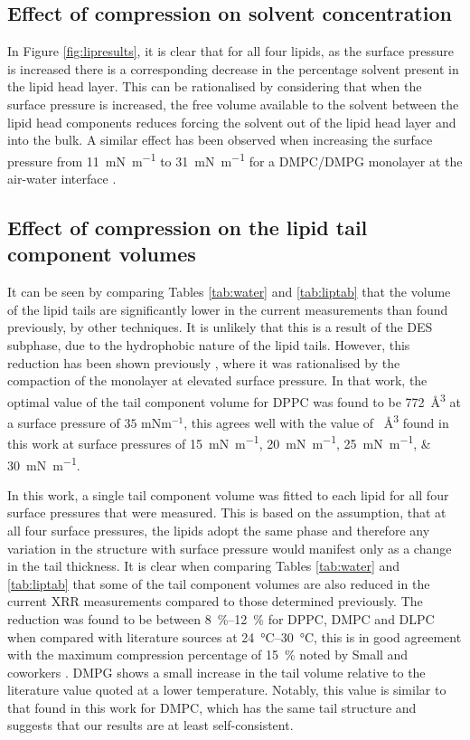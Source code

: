 \documentclass[amsmath,amssymb,twocolumn,superscriptaddress]{revtex4-1}
\begin{document}
\subsection{Effect of compression on solvent concentration}
%
In Figure \ref{fig:lipresults}, it is clear that for all four lipids, as the surface pressure is increased there is a corresponding decrease in the percentage solvent present in the lipid head layer.
This can be rationalised by considering that when the surface pressure is increased, the free volume available to the solvent between the lipid head components reduces forcing the solvent out of the lipid head layer and into the bulk.
A similar effect has been observed when increasing the surface pressure from \SI{11}{\milli\newton\per\meter} to \SI{31}{\milli\newton\per\meter} for a DMPC/DMPG monolayer at the air-water interface \cite{bayerl_specular_1990}.

\subsection{Effect of compression on the lipid tail component volumes}
%
It can be seen by comparing Tables \ref{tab:water} and \ref{tab:liptab} that the volume of the lipid tails are significantly lower in the current measurements than found previously, by other techniques.
It is unlikely that this is a result of the DES subphase, due to the hydrophobic nature of the lipid tails.
However, this reduction has been shown previously \cite{campbell_structure_2018}, where it was rationalised by the compaction of the monolayer at elevated surface pressure.
In that work, the optimal value of the tail component volume for DPPC was found to be \SI{772}{\angstrom\cubed} at a surface pressure of $35$ mNm$^{-1}$, this agrees well with the value of ~\si{\angstrom\cubed} found in this work at surface pressures of \SIlist[list-units = single]{15;20;25;30}{\milli\newton\per\meter}.

In this work, a single tail component volume was fitted to each lipid for all four surface pressures that were measured.
This is based on the assumption, that at all four surface pressures, the lipids adopt the same phase and therefore any variation in the structure with surface pressure would manifest only as a change in the tail thickness.
It is clear when comparing Tables \ref{tab:water} and \ref{tab:liptab} that some of the tail component volumes are also reduced in the current XRR measurements compared to those determined previously.
The reduction was found to be between \SIrange{8}{12}{\percent} for DPPC, DMPC and DLPC when compared with literature sources at \SIrange{24}{30}{\celsius}, this is in good agreement with the maximum compression percentage of \SI{15}{\percent} noted by Small and coworkers \cite{small_lateral_1984}.
DMPG shows a small increase in the tail volume relative to the literature value quoted at a lower temperature.
Notably, this value is similar to that found in this work for DMPC, which has the same tail structure and suggests that our results are at least self-consistent.
\end{document}
